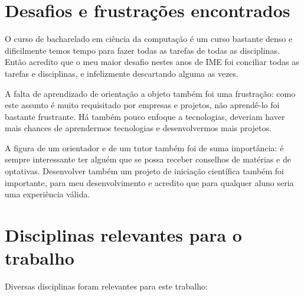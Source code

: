 
\section{Desafios e frustrações encontrados}

O curso de bacharelado em ciência da computação é um curso bastante denso e dificilmente temos tempo
para fazer todas as tarefas de todas as disciplinas. Então acredito que o meu maior desafio nestes anos de IME 
foi conciliar todas as tarefas e disciplinas, e infelizmente descartando alguma as vezes. 

A falta de aprendizado de orientação a objeto também foi uma frustração: como este assunto é muito requisitado por empresas
e projetos, não aprendê-lo foi bastante frustrante. Há também pouco enfoque a tecnologias, deveriam haver mais chances de
aprendermos tecnologias e desenvolvermos mais projetos. 

A figura de um orientador e de um tutor também foi de suma importância: é sempre interessante ter alguém que se possa receber
conselhos de matérias e de optativas. Desenvolver também um projeto de iniciação científica também foi importante, para 
meu desenvolvimento e acredito que para qualquer aluno seria uma experiência válida. 

 

\section{Disciplinas relevantes para o trabalho}

Diversas disciplinas foram relevantes para este trabalho:

